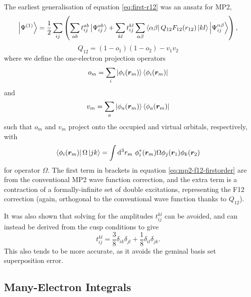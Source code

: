 The earliest generalisation of equation \ref{eq:first-r12} was an ansatz for MP2,\supercite{klopperMollerplesset1987,kutzelniggWave1991,klopperOrbitalinvariant1991,tewOpenshell2010,bokhanImplementation2008}
\begin{equation}
    \label{eq:mp2-f12-firstorder}
    \ket{\Psi^{(1)}} = \frac 12\sum_{ij}\left( \sum_{ab}t_{ij}^{ab}\ket{\Psi_{ij}^{ab}} + \sum_{kl}t_{ij}^{kl}\sum_{\alpha\beta}\bra{\alpha\beta}Q_{12}F_{12}(r_{12})\ket{kl}\ket{\Psi_{ij}^{\alpha\beta}} \right),
\end{equation}
\begin{equation}
    \label{eq:mp2-f12-projector}
    Q_{12} = (1-o_1)(1-o_2) - v_1v_2
\end{equation}
where we define the one-electron projection operators
\begin{equation}
    o_m = \sum_i\ket{\phi_i(\bm r_m)}\bra{\phi_i(\bm r_m)}
\end{equation}
and
\begin{equation}
    v_m = \sum_a\ket{\phi_a(\bm r_m)}\bra{\phi_a(\bm r_m)}
\end{equation}
such that $o_m$ and $v_m$ project onto the occupied and virtual orbitals, respectively, with
\begin{equation}
    \bra{\phi_i(\bm r_m)}\Omega\ket{jk} = \int\mathrm{d}^3r_m\ \phi_i^*(\bm r_m)\Omega\phi_j(\bm r_1)\phi_k(\bm r_2)
\end{equation}
for operator $\Omega$. The first term in brackets in equation \ref{eq:mp2-f12-firstorder} are from the conventional MP2 wave function correction, and the extra term is a contraction of a formally-infinite set of double excitations, representing the F12 correction (again, orthogonal to the conventional wave function thanks to $Q_{12}$).

It was also shown that solving for the amplitudes $t_{ij}^{kl}$ can be avoided,\supercite{ten-noNew2007,tewComparison2006,wernerGeneral2007,klopperExplicitly2002,petersonBenchmark1994} and can instead be derived from the cusp conditions to give
\begin{equation}
    t_{ij}^{kl} = \frac 38\delta_{ik}\delta_{jl}+\frac 18\delta_{il}\delta_{jk}.
\end{equation}
This also tends to be more accurate, as it avoids the geminal basis set superposition error.\supercite{tewComparison2006,adlerSimple2007}

\subsection{Many-Electron Integrals}

